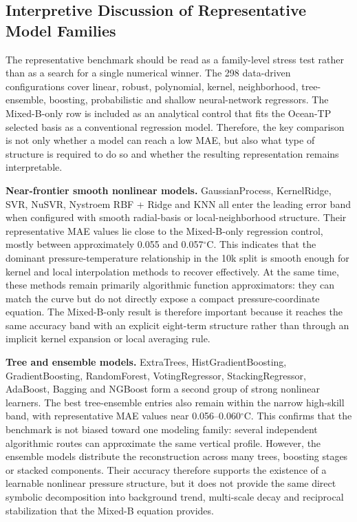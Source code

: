 \documentclass[10pt]{article}
\begin{document}
\subsection{Interpretive Discussion of Representative Model Families}

\noindent
The representative benchmark should be read as a family-level stress test rather than as a search for a single numerical winner.
The 298 data-driven configurations cover linear, robust, polynomial, kernel, neighborhood, tree-ensemble, boosting, probabilistic and shallow neural-network regressors.
The Mixed-B-only row is included as an analytical control that fits the Ocean-TP selected basis as a conventional regression model.
Therefore, the key comparison is not only whether a model can reach a low MAE, but also what type of structure is required to do so and whether the resulting representation remains interpretable.

\vspace{0.25em}
\noindent\textbf{Near-frontier smooth nonlinear models.}
GaussianProcess, KernelRidge, SVR, NuSVR, Nystroem RBF + Ridge and KNN all enter the leading error band when configured with smooth radial-basis or local-neighborhood structure.
Their representative MAE values lie close to the Mixed-B-only regression control, mostly between approximately 0.055 and 0.057$^\circ$C.
This indicates that the dominant pressure-temperature relationship in the 10k split is smooth enough for kernel and local interpolation methods to recover effectively.
At the same time, these methods remain primarily algorithmic function approximators: they can match the curve but do not directly expose a compact pressure-coordinate equation.
The Mixed-B-only result is therefore important because it reaches the same accuracy band with an explicit eight-term structure rather than through an implicit kernel expansion or local averaging rule.

\vspace{0.25em}
\noindent\textbf{Tree and ensemble models.}
ExtraTrees, HistGradientBoosting, GradientBoosting, RandomForest, VotingRegressor, StackingRegressor, AdaBoost, Bagging and NGBoost form a second group of strong nonlinear learners.
The best tree-ensemble entries also remain within the narrow high-skill band, with representative MAE values near 0.056--0.060$^\circ$C.
This confirms that the benchmark is not biased toward one modeling family: several independent algorithmic routes can approximate the same vertical profile.
However, the ensemble models distribute the reconstruction across many trees, boosting stages or stacked components.
Their accuracy therefore supports the existence of a learnable nonlinear pressure structure, but it does not provide the same direct symbolic decomposition into background trend, multi-scale decay and reciprocal stabilization that the Mixed-B equation provides.
\end{document}
